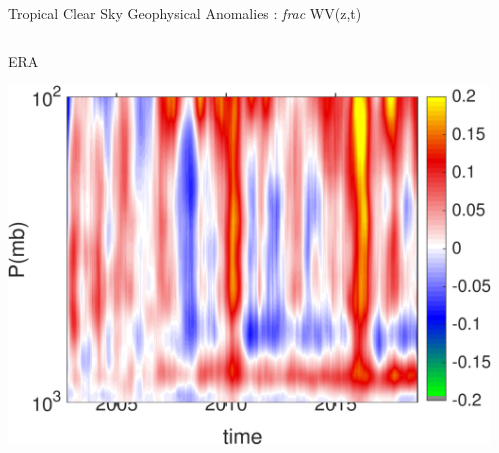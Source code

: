 \documentclass[10pt,t]{beamer}
\begin{document}

\begin{frame}{Tropical Clear Sky Geophysical Anomalies : \textit{frac} WV(z,t)}
\vspace{-0.35in}

\begin{columns}
\begin{column}{0.45\columnwidth}
\begin{block}{\footnotesize ERA}
\vspace{-0.1in}
\begin{center}
\includegraphics[width=\linewidth]{Figs/ClearAnom/era_clr_wv_anom_200209_201808.png}
\end{center}
\end{block}
\end{column}

\begin{column}{0.45\columnwidth}
\end{column}
\end{columns}

\vspace{-0.25in}


\end{frame}
\end{document}

